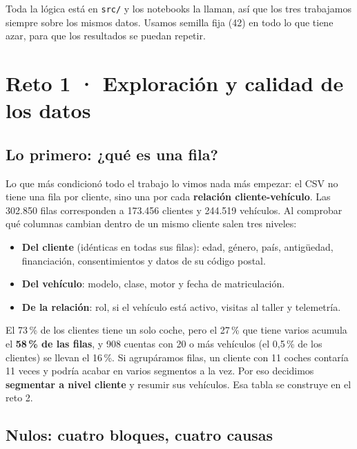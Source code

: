 \documentclass[11pt,a4paper]{article}
\newcommand{\var}[1]{\texttt{\small #1}}
\begin{document}
Toda la lógica está en \var{src/} y los notebooks la llaman, así que los tres trabajamos siempre sobre los mismos datos. Usamos semilla fija (42) en todo lo que tiene azar, para que los resultados se puedan repetir.

\section{Reto 1 · Exploración y calidad de los datos}

\subsection*{Lo primero: ¿qué es una fila?}

Lo que más condicionó todo el trabajo lo vimos nada más empezar: el CSV no tiene una fila por cliente, sino una por cada \textbf{relación cliente-vehículo}. Las 302.850 filas corresponden a 173.456 clientes y 244.519 vehículos. Al comprobar qué columnas cambian dentro de un mismo cliente salen tres niveles:

\begin{itemize}
  \item \textbf{Del cliente} (idénticas en todas sus filas): edad, género, país, antigüedad, financiación, consentimientos y datos de su código postal.
  \item \textbf{Del vehículo}: modelo, clase, motor y fecha de matriculación.
  \item \textbf{De la relación}: rol, si el vehículo está activo, visitas al taller y telemetría.
\end{itemize}

El 73\,\% de los clientes tiene un solo coche, pero el 27\,\% que tiene varios acumula el \textbf{58\,\% de las filas}, y 908 cuentas con 20 o más vehículos (el 0,5\,\% de los clientes) se llevan el 16\,\%. Si agrupáramos filas, un cliente con 11 coches contaría 11 veces y podría acabar en varios segmentos a la vez. Por eso decidimos \textbf{segmentar a nivel cliente} y resumir sus vehículos. Esa tabla se construye en el reto 2.

\subsection*{Nulos: cuatro bloques, cuatro causas}
\end{document}
